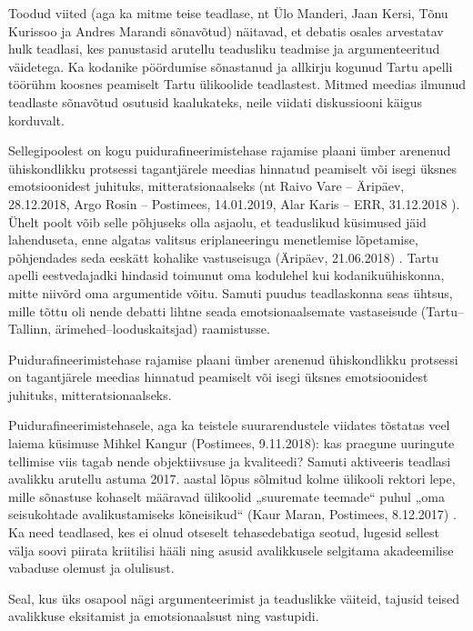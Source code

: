 \documentclass[estonian,]{article}
\begin{document}
Toodud viited (aga ka mitme teise teadlase, nt Ülo Manderi, Jaan Kersi, Tõnu Kurissoo ja Andres Marandi sõnavõtud) näitavad, et debatis osales arvestatav hulk teadlasi, kes panustasid arutellu teadusliku teadmise ja argumenteeritud väidetega. Ka kodanike pöördumise sõnastanud ja allkirju kogunud Tartu apelli töörühm koosnes peamiselt Tartu ülikoolide teadlastest. Mitmed meedias ilmunud teadlaste sõnavõtud osutusid kaalukateks, neile viidati diskussiooni käigus korduvalt.

Sellegipoolest on kogu puidurafineerimistehase rajamise plaani ümber arenenud ühiskondlikku protsessi tagantjärele meedias hinnatud peamiselt või isegi üksnes emotsioonidest juhituks, mitteratsionaalseks (nt Raivo Vare -- Äripäev, 28.12.2018, Argo Rosin -- Postimees, 14.01.2019, Alar Karis -- ERR, 31.12.2018 ). Ühelt poolt võib selle põhjuseks olla asjaolu, et teaduslikud küsimused jäid lahenduseta, enne algatas valitsus eriplaneeringu menetlemise lõpetamise, põhjendades seda eeskätt kohalike vastuseisuga (Äripäev, 21.06.2018) . Tartu apelli eestvedajadki hindasid toimunut oma kodulehel kui kodanikuühiskonna, mitte niivõrd oma argumentide võitu. Samuti puudus teadlaskonna seas ühtsus, mille tõttu oli nende debatti lihtne seada emotsionaalsemate vastaseisude (Tartu--Tallinn, ärimehed--looduskaitsjad) raamistusse.

\begin{blockquote-right}
Puidurafineerimistehase rajamise plaani ümber arenenud ühiskondlikku
protsessi on tagantjärele meedias hinnatud peamiselt või isegi üksnes
emotsioonidest juhituks, mitteratsionaalseks.
\end{blockquote-right}

Puidurafineerimistehasele, aga ka teistele suurarendustele viidates tõstatas veel laiema küsimuse Mihkel Kangur (Postimees, 9.11.2018): kas praegune uuringute tellimise viis tagab nende objektiivsuse ja kvaliteedi? Samuti aktiveeris teadlasi avalikku arutellu astuma 2017. aastal lõpus sõlmitud kolme ülikooli rektori lepe, mille sõnastuse kohaselt määravad ülikoolid „suuremate teemade`` puhul „oma seisukohtade avalikustamiseks kõneisikud`` (Kaur Maran, Postimees, 8.12.2017) . Ka need teadlased, kes ei olnud otseselt tehasedebatiga seotud, lugesid sellest välja soovi piirata kriitilisi hääli ning asusid avalikkusele selgitama akadeemilise vabaduse olemust ja olulisust.

\begin{blockquote-left}
Seal, kus üks osapool nägi argumenteerimist ja teaduslikke väiteid,
tajusid teised avalikkuse eksitamist ja emotsionaalsust ning vastupidi.
\end{blockquote-left}
\end{document}
